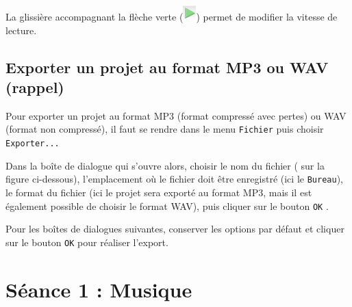 \begin{itemize}


La glissière accompagnant la flèche verte (\includegraphics[angle=0,width=.4cm]{./images/son02/fleche_verte}) permet de modifier la vitesse de lecture.

\end{itemize}



\subsection{Exporter un projet au format MP3 ou WAV (rappel)} 

Pour exporter un projet au format MP3 (format compressé avec pertes) ou WAV (format non compressé), il faut se rendre dans le menu \texttt{Fichier} puis choisir \texttt{Exporter...}

\vspace{6pt}

Dans la boîte de dialogue qui s'ouvre alors, choisir le nom du fichier ( sur la figure ci-dessous), l'emplacement où le fichier doit être enregistré  (ici le \texttt{Bureau}), le format du fichier  (ici le projet sera exporté au format MP3, mais il est également possible de choisir le format WAV), puis cliquer sur le bouton \texttt{OK} .       


Pour les boîtes de dialogues suivantes, conserver les options par défaut et cliquer sur le bouton \texttt{OK} pour réaliser l'export. 



%
%
%
%

\pagebreak

\section{Séance 1 : Musique}\label{ficheSon4e1}


\vfill





